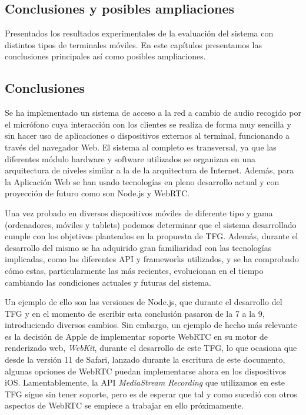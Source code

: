 \clearpage
{}%
\begin{center}
\begin{minipage}{.75\textwidth}
\section{Conclusiones y posibles ampliaciones}

Presentados los resultados experimentales de la evaluación del sistema con distintos tipos de terminales móviles. En este capítulos presentamos las conclusiones principales así como posibles ampliaciones. %
\end{minipage}
\end{center}
\clearpage%

\subsection{Conclusiones}
Se ha implementado un sistema de acceso a la red a cambio de audio recogido por el micrófono cuya interacción con los clientes se realiza de forma muy sencilla y sin hacer uso de aplicaciones o dispositivos externos al terminal, funcionando a través del navegador Web. El sistema al completo es transversal, ya que las diferentes módulo hardware y software utilizados se organizan en una arquitectura de niveles similar a la de la arquitectura de Internet. Además, para la Aplicación Web se han usado tecnologías en pleno desarrollo actual y con proyección de futuro como son Node.js y WebRTC.

Una vez probado en diversos dispositivos móviles de diferente tipo y gama (ordenadores, móviles y tablets) podemos determinar que el sistema desarrollado cumple con los objetivos planteados en la propuesta de TFG. Además, durante el desarrollo del mismo se ha adquirido gran familiaridad con las tecnologías implicadas, como las diferentes API y frameworks utilizados, y se ha comprobado cómo estas, particularmente las más recientes, evolucionan en el tiempo cambiando las condiciones actuales y futuras del sistema.

Un ejemplo de ello son las versiones de Node.js, que durante el desarrollo del TFG y en el momento de escribir esta conclusión pasaron de la 7 a la 9, introduciendo diversos cambios. Sin embargo, un ejemplo de hecho más relevante es la decisión de Apple de implementar soporte WebRTC en su motor de renderizado web, \emph{WebKit}, durante el desarrollo de este TFG, lo que ocasiona que desde la versión 11 de Safari, lanzado durante la escritura de este documento, algunas opciones de WebRTC puedan implementarse ahora en los dispositivos iOS. Lamentablemente, la API \emph{MediaStream Recording} que utilizamos en este TFG sigue sin tener soporte, pero es de esperar que tal y como sucedió con otros aspectos de WebRTC se empiece a trabajar en ello próximamente.

